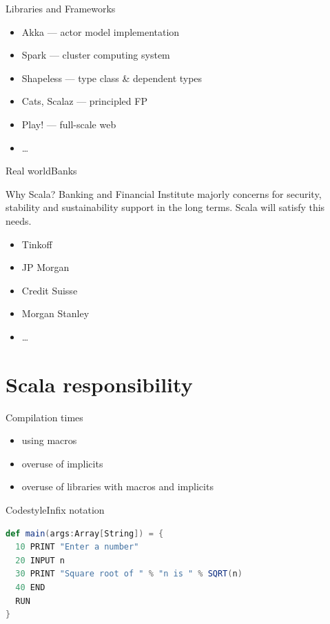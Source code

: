 \documentclass[aspectratio=169]{beamer}
\begin{document}
\begin{frame}{Libraries and Frameworks}
  \begin{itemize}
    \item Akka --- actor model implementation
      \pause
    \item Spark --- cluster computing system
      \pause
    \item Shapeless --- type class \& dependent types
      \pause
    \item Cats, Scalaz --- principled FP
      \pause
    \item Play! --- full-scale web
      \pause
    \item \ldots
  \end{itemize}
\end{frame}

\begin{frame}{Real world}{Banks}
  \begin{block}{Why Scala?}
    Banking and Financial Institute majorly concerns for security, stability and sustainability
    support in the long terms. Scala will satisfy this needs.
  \end{block}
  \begin{itemize}
    \item Tinkoff
    \item JP Morgan
    \item Credit Suisse
    \item Morgan Stanley
    \item \ldots
  \end{itemize}
\end{frame}

\section{Scala responsibility}

\begin{frame}{Compilation times}
  \begin{itemize}
    \item using macros
    \item overuse of implicits
    \item overuse of libraries with macros and implicits
  \end{itemize}
\end{frame}

\begin{frame}[fragile]{Codestyle}{Infix notation}
\begin{lstlisting}[style=scala,language=scala]
def main(args:Array[String]) = {
  10 PRINT "Enter a number"
  20 INPUT n
  30 PRINT "Square root of " % "n is " % SQRT(n)
  40 END
  RUN
}
\end{lstlisting}
\end{frame}
\end{document}
